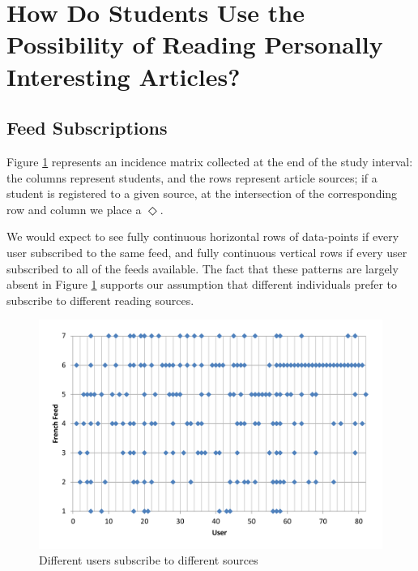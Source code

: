 
\section{How Do Students Use the Possibility of Reading Personally Interesting Articles?}
\label{sec:results}


\subsection {Feed Subscriptions}
Figure \ref{fig:subscriptions} represents an incidence matrix collected at the end of the study interval: the columns represent students, and the rows represent article sources; if a student is registered to a given source, at the intersection of the corresponding row and column we place a $\Diamond$. 

We would expect to see fully continuous horizontal rows of data-points if every user subscribed to the same feed, and fully continuous vertical rows if every user subscribed to all of the feeds available. The fact that these patterns are largely absent in Figure \ref{fig:subscriptions} supports our assumption that different individuals prefer to subscribe to different reading sources.


\begin{figure}[h!]

\centering
  \includegraphics[width=\columnwidth]{figures/users_feeds}
  \caption{Different users subscribe to different sources}
  \label{fig:subscriptions}  
\end{figure}

